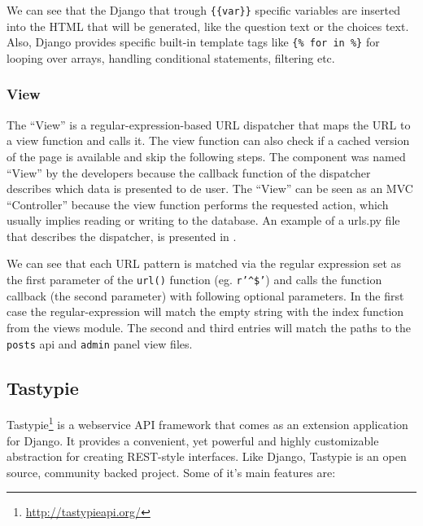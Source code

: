 

We can see that the Django that trough \texttt{\{\{var\}\}} specific variables are inserted into the HTML that will be generated, like the question text or the choices text. Also, Django provides specific built-in template tags like \texttt{\{\% for in \%\}} for looping over arrays, handling conditional statements, filtering etc.

\subsubsection{View}
\label{sub-sub-sec:view}

The ``View'' is a regular-expression-based URL dispatcher that maps the URL to a view function and calls it. The view function can also check if a cached version of the page is available and skip the following steps. The component was named ``View'' by the developers because the callback function of the dispatcher describes which data is presented to de user. The ``View'' can be seen as an MVC ``Controller'' because the view function performs the requested action, which usually implies reading or writing to the database. An example of a urls.py file that describes the dispatcher, is presented in .



We can see that each URL pattern is matched via the regular expression set as the first parameter of the \texttt{url()} function (eg. \texttt{r'\^{}\$'}) and calls the function callback (the second parameter) with following optional parameters. In the first case the regular-expression will match the empty string with the index function from the views module. The second and third entries will match the paths to the \texttt{posts} api and \texttt{admin} panel view files.



\subsection{Tastypie}
\label{sub-sec:tastypie}

Tastypie\footnote{\url{http://tastypieapi.org/}} is a webservice API framework that comes as an extension application for Django. It provides a convenient, yet powerful and highly customizable abstraction for creating REST-style interfaces. Like Django, Tastypie is an open source, community backed project. Some of it's main features are:

